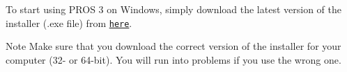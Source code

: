 To start using P\+R\+OS 3 on Windows, simply download the latest version of the installer (.exe file) from \href{https://github.com/purduesigbots/pros-cli3/releases/latest/}{\tt here}.

\begin{DoxyNote}{Note}
Make sure that you download the correct version of the installer for your computer (32-\/ or 64-\/bit). You will run into problems if you use the wrong one. 
\end{DoxyNote}
